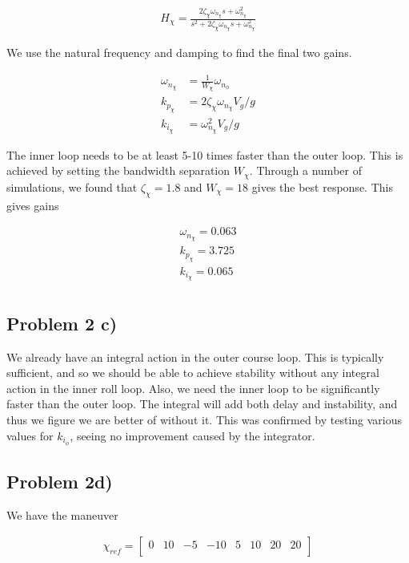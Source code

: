 \begin{align}
    H_{\chi} = \frac{2\zeta_{\chi}\omega_{n_{\chi}}s + \omega^2_{n_{\chi}}}{s^2 + 2\zeta_{\chi}\omega_{n_{\chi}}s + \omega^2_{n_{\chi}}}
\end{align}

We use the natural frequency and damping to find the final two gains.

\begin{align}
    \omega_{n_{\chi}} &= \frac{1}{W_{\chi}} \omega_{n_{\phi}} \\
    k_{p_{\chi}} &= 2\zeta_{\chi}\omega_{n_{\chi}}V_g/g \\
    k_{i_{\chi}} &= \omega^2_{n_{\chi}}V_g/g 
\end{align}

The inner loop needs to be at least 5-10 times faster than the outer loop. This is achieved by setting the bandwidth separation $W_{\chi}$. Through a number of simulations, we found that $\zeta_{\chi} = 1.8$ and $W_{\chi}= 18$ gives the best response. This gives gains

\begin{align}
    \omega_{n_{\chi}} = 0.063 \\
    k_{p_{\chi}} = 3.725 \\
    k_{i_{\chi}} = 0.065 \\
\end{align}

\subsection*{Problem 2 c)}

We already have an integral action in the outer course loop. This is typically sufficient, and so we should be able to achieve stability without any integral action in the inner roll loop. Also, we need the inner loop to be significantly faster than the outer loop. The integral will add both delay and instability, and thus we figure we are better of without it. This was confirmed by testing various values for $k_{i_{\phi}}$, seeing no improvement caused by the integrator.


\subsection*{Problem 2d)}

We have the maneuver 

\begin{align}
    \chi_{ref} = 
    \begin{bmatrix}
    0 & 10 & -5 & -10 & 5 & 10 & 20 & 20 \\
    \end{bmatrix}
\end{align}

